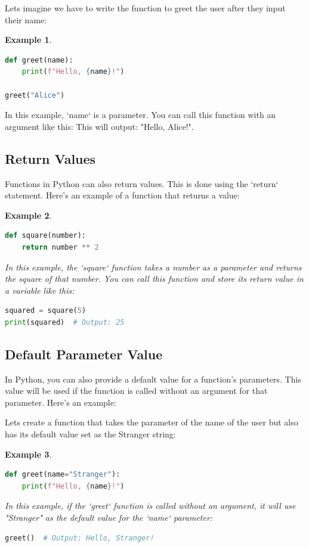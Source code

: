 \documentclass[12pt]{article}
\newtheorem{Example}{Example}[section]
\begin{document}
Lets imagine we have to write the function to greet the user after they input their name:
\begin{Example} 
\begin{lstlisting}[language=Python]
def greet(name):
    print(f"Hello, {name}!")
    
greet("Alice")
\end{lstlisting}
\end{Example}

In this example, `name` is a parameter. You can call this function with an argument like this:
This will output: "Hello, Alice!".

\subsection{Return Values}
Functions in Python can also return values. This is done using the `return` statement. Here's an example of a function that returns a value:

\begin{Example}
\begin{lstlisting}[language=Python]
def square(number):
    return number ** 2
\end{lstlisting}
In this example, the `square` function takes a number as a parameter and returns the square of that number. You can call this function and store its return value in a variable like this:
\begin{lstlisting}[language=Python]
squared = square(5)
print(squared)  # Output: 25
\end{lstlisting}
\end{Example}

\subsection{Default Parameter Value}
In Python, you can also provide a default value for a function's parameters. This value will be used if the function is called without an argument for that parameter. Here's an example:


Lets create a function that takes the parameter of the name of the user but also has its default value set as the Stranger string:
\begin{Example}
\begin{lstlisting}[language=Python]
def greet(name="Stranger"):
    print(f"Hello, {name}!")
\end{lstlisting}
In this example, if the `greet` function is called without an argument, it will use "Stranger" as the default value for the `name` parameter:
\begin{lstlisting}[language=Python]
greet()  # Output: Hello, Stranger!
\end{lstlisting}
\end{Example}
\end{document}
